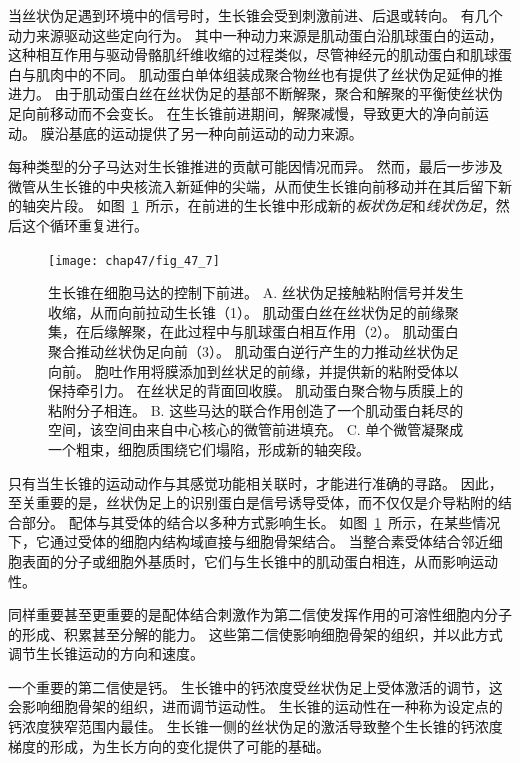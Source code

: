 当丝状伪足遇到环境中的信号时，生长锥会受到刺激前进、后退或转向。
有几个动力来源驱动这些定向行为。
其中一种动力来源是肌动蛋白沿肌球蛋白的运动，这种相互作用与驱动骨骼肌纤维收缩的过程类似，尽管神经元的肌动蛋白和肌球蛋白与肌肉中的不同。
肌动蛋白单体组装成聚合物丝也有提供了丝状伪足延伸的推进力。
由于肌动蛋白丝在丝状伪足的基部不断解聚，聚合和解聚的平衡使丝状伪足向前移动而不会变长。
在生长锥前进期间，解聚减慢，导致更大的净向前运动。
膜沿基底的运动提供了另一种向前运动的动力来源。


每种类型的分子马达对生长锥推进的贡献可能因情况而异。
然而，最后一步涉及微管从生长锥的中央核流入新延伸的尖端，从而使生长锥向前移动并在其后留下新的轴突片段。
如图~\ref{fig:47_7}~所示，在前进的生长锥中形成新的\textit{板状伪足}和\textit{线状伪足}，然后这个循环重复进行。


\begin{figure}[htbp]
	\centering
	\texttt{[image: chap47/fig\_47\_7]}
	\caption{生长锥在细胞马达的控制下前进\cite{heidemann1996cytoplasmic}。
		A. 丝状伪足接触粘附信号并发生收缩，从而向前拉动生长锥（1）。
		肌动蛋白丝在丝状伪足的前缘聚集，在后缘解聚，在此过程中与肌球蛋白相互作用（2）。
		肌动蛋白聚合推动丝状伪足向前（3）。
		肌动蛋白逆行产生的力推动丝状伪足向前。
		胞吐作用将膜添加到丝状足的前缘，并提供新的粘附受体以保持牵引力。
		在丝状足的背面回收膜。
		肌动蛋白聚合物与质膜上的粘附分子相连。
		B. 这些马达的联合作用创造了一个肌动蛋白耗尽的空间，该空间由来自中心核心的微管前进填充。
		C. 单个微管凝聚成一个粗束，细胞质围绕它们塌陷，形成新的轴突段。}
	\label{fig:47_7}
\end{figure}


只有当生长锥的运动动作与其感觉功能相关联时，才能进行准确的寻路。
因此，至关重要的是，丝状伪足上的识别蛋白是信号诱导受体，而不仅仅是介导粘附的结合部分。
配体与其受体的结合以多种方式影响生长。
如图~\ref{fig:47_7}~所示，在某些情况下，它通过受体的细胞内结构域直接与细胞骨架结合。
当整合素受体结合邻近细胞表面的分子或细胞外基质时，它们与生长锥中的肌动蛋白相连，从而影响运动性。


同样重要甚至更重要的是配体结合刺激作为第二信使发挥作用的可溶性细胞内分子的形成、积累甚至分解的能力。
这些第二信使影响细胞骨架的组织，并以此方式调节生长锥运动的方向和速度。


一个重要的第二信使是钙。
生长锥中的钙浓度受丝状伪足上受体激活的调节，这会影响细胞骨架的组织，进而调节运动性。
生长锥的运动性在一种称为设定点的钙浓度狭窄范围内最佳。
生长锥一侧的丝状伪足的激活导致整个生长锥的钙浓度梯度的形成，为生长方向的变化提供了可能的基础。


